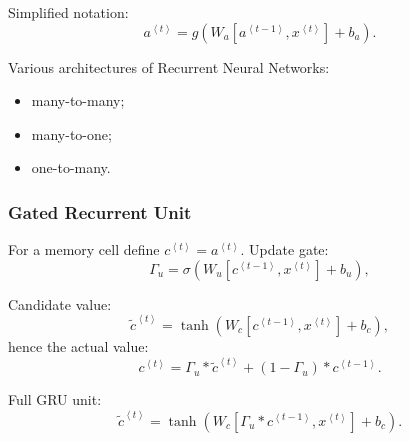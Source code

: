 \documentclass[a4paper,11pt]{article}
\begin{document}
Simplified notation:
\begin{equation}
a^{\left\langle t \right\rangle} = g \left( W_a \left[ a^{\left\langle t-1 \right\rangle} , x^{\left\langle t \right\rangle} \right] + b_a \right) .
\end{equation}

Various architectures of Recurrent Neural Networks:
\begin{itemize}
\item many-to-many;
\item many-to-one;
\item one-to-many.
\end{itemize}
\subsubsection{Gated Recurrent Unit}
For a memory cell define \textcolor{OliveGreen}{$c^{\left\langle t \right\rangle} = a^{\left\langle t \right\rangle}$}. Update gate:
\begin{equation}
\Gamma_u = \sigma \left( W_u \left[ c^{\left\langle t-1 \right\rangle} , x^{\left\langle t \right\rangle} \right] + b_u \right) ,
\end{equation}

Candidate value:
\begin{equation}
\tilde{c}^{\left\langle t \right\rangle} = \tanh \left( W_c \left[ c^{\left\langle t-1 \right\rangle} , x^{\left\langle t \right\rangle} \right] + b_c \right) ,
\end{equation}
hence the actual value:
\begin{equation}
c^{\left\langle t \right\rangle} = \Gamma_u \ast \tilde{c}^{\left\langle t \right\rangle} + \left(1 - \Gamma_u \right) \ast c^{\left\langle t-1 \right\rangle} .
\end{equation}

Full GRU unit:
\begin{equation}
\tilde{c}^{\left\langle t \right\rangle} = \tanh \left( W_c \left[ \Gamma_u \ast c^{\left\langle t-1 \right\rangle} , x^{\left\langle t \right\rangle} \right] + b_c \right) .
\end{equation}
\end{document}
